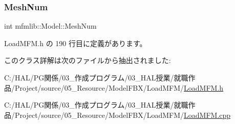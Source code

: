\subsubsection{\texorpdfstring{Mesh\+Num}{MeshNum}}
{\footnotesize\ttfamily int mfmlib\+::\+Model\+::\+Mesh\+Num}



 Load\+M\+F\+M.\+h の 190 行目に定義があります。



このクラス詳解は次のファイルから抽出されました\+:\begin{DoxyCompactItemize}
\item 
C\+:/\+H\+A\+L/\+P\+G関係/03\+\_\+作成プログラム/03\+\_\+\+H\+A\+L授業/就職作品/\+Project/source/05\+\_\+\+Resource/\+Model\+F\+B\+X/\+Load\+M\+F\+M/\mbox{\hyperlink{_load_m_f_m_8h}{Load\+M\+F\+M.\+h}}\item 
C\+:/\+H\+A\+L/\+P\+G関係/03\+\_\+作成プログラム/03\+\_\+\+H\+A\+L授業/就職作品/\+Project/source/05\+\_\+\+Resource/\+Model\+F\+B\+X/\+Load\+M\+F\+M/\mbox{\hyperlink{_load_m_f_m_8cpp}{Load\+M\+F\+M.\+cpp}}\end{DoxyCompactItemize}
